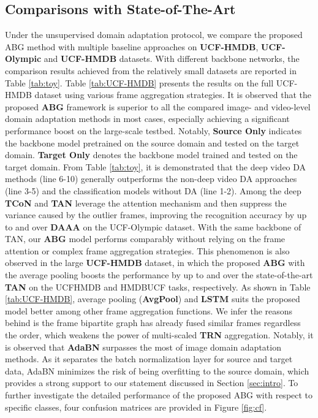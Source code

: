 \subsection{Comparisons with State-of-The-Art}
 Under the unsupervised domain adaptation protocol, we compare the proposed ABG method with multiple baseline approaches on \textbf{UCF-HMDB}, \textbf{UCF-Olympic} and \textbf{UCF-HMDB} datasets. With different backbone networks, the comparison results achieved from the relatively small datasets are reported in Table \ref{tab:toy}. Table \ref{tab:UCF-HMDB} presents the results on the full UCF-HMDB dataset using various frame aggregation strategies. It is observed that the proposed \textbf{ABG} framework is superior to all the compared image- and video-level domain adaptation methods in most cases, especially achieving a significant performance boost on the large-scale testbed. Notably, \textbf{Source Only} indicates the backbone model pretrained on the source domain and tested on the target domain. \textbf{Target Only} denotes the backbone model trained and tested on the target domain. From Table \ref{tab:toy}, it is demonstrated that the deep video DA methods (line 6-10) generally outperforms the non-deep video DA approaches (line 3-5) and the classification models without DA (line 1-2). Among the deep \textbf{TCoN} and \textbf{TAN} leverage the attention mechanism and then suppress the variance caused by the outlier frames, improving the recognition accuracy by up to  and  over \textbf{DAAA} on the UCF-Olympic dataset. With the same backbone of TAN, our \textbf{ABG} model performs comparably without relying on the frame attention or complex frame aggregation strategies. This phenomenon is also observed in the large \textbf{UCF-HMDB} dataset, in which the proposed \textbf{ABG} with the average pooling boosts the performance by up to  and  over the state-of-the-art \textbf{TAN} on the UCFHMDB and HMDBUCF tasks, respectively. As shown in Table \ref{tab:UCF-HMDB}, average pooling (\textbf{AvgPool}) and \textbf{LSTM} suits the proposed model better among other frame aggregation functions. We infer the reasons behind is the frame bipartite graph has already fused similar frames regardless the order, which weakens the power of multi-scaled \textbf{TRN} aggregation. Notably, it is observed that \textbf{AdaBN} surpasses the most of image domain adaptation methods. As it separates the batch normalization layer for source and target data, AdaBN minimizes the risk of being overfitting to the source domain, which provides a strong support to our statement discussed in Section \ref{sec:intro}. To further investigate the detailed performance of the proposed ABG with respect to specific classes, four confusion matrices are provided in Figure \ref{fig:cf}.



